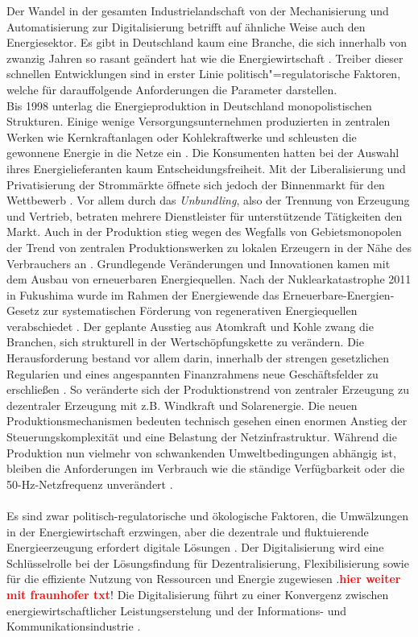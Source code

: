 Der Wandel in der gesamten Industrielandschaft von der Mechanisierung und Automatisierung zur Digitalisierung betrifft auf ähnliche Weise auch den Energiesektor. Es gibt in Deutschland kaum eine Branche, die sich innerhalb von zwanzig Jahren so rasant geändert hat wie die Energiewirtschaft \citep{Doleski2015}. Treiber dieser schnellen Entwicklungen sind in erster Linie politisch"=regulatorische Faktoren, welche für darauffolgende Anforderungen die Parameter darstellen.
\\Bis 1998 unterlag die Energieproduktion in Deutschland monopolistischen Strukturen. Einige wenige Versorgungsunternehmen produzierten in zentralen Werken wie Kernkraftanlagen oder Kohlekraftwerke und schleusten die gewonnene Energie in die Netze ein \citep{Utecht2018}. Die Konsumenten hatten bei der Auswahl ihres Energielieferanten kaum Entscheidungsfreiheit. Mit der Liberalisierung und Privatisierung der Strommärkte öffnete sich jedoch der Binnenmarkt für den Wettbewerb \citep{Doleski2017}. Vor allem durch das \textit{Unbundling}, also der Trennung von Erzeugung und Vertrieb, betraten mehrere Dienstleister für unterstützende Tätigkeiten den Markt. Auch in der Produktion stieg wegen des Wegfalls von Gebietsmonopolen der Trend von zentralen Produktionswerken zu lokalen Erzeugern in der Nähe des Verbrauchers an \citep{Utecht2018}. Grundlegende Veränderungen und Innovationen kamen mit dem Ausbau von erneuerbaren Energiequellen. Nach der Nuklearkatastrophe 2011 in Fukushima wurde im Rahmen der Energiewende das Erneuerbare-Energien-Gesetz zur systematischen Förderung von regenerativen Energiequellen verabschiedet \citep{Doleski2015}. Der geplante Ausstieg aus Atomkraft und Kohle zwang die Branchen, sich strukturell in der Wertschöpfungskette zu verändern. Die Herausforderung bestand vor allem darin, innerhalb der strengen gesetzlichen Regularien und eines angespannten Finanzrahmens neue Geschäftsfelder zu erschließen \citep{Doleski2015}. So veränderte sich der Produktionstrend von zentraler Erzeugung zu dezentraler Erzeugung mit z.B. Windkraft und Solarenergie. Die neuen Produktionsmechanismen bedeuten technisch gesehen einen enormen Anstieg der Steuerungskomplexität und eine Belastung der Netzinfrastruktur. Während die Produktion nun vielmehr von schwankenden Umweltbedingungen abhängig ist, bleiben die Anforderungen im Verbrauch wie die ständige Verfügbarkeit oder die 50-Hz-Netzfrequenz unverändert \citep{Utecht2018}.
\\\\
\noindent Es sind zwar politisch-regulatorische und ökologische Faktoren, die Umwälzungen in der Energiewirtschaft erzwingen, aber die dezentrale und fluktuierende Energieerzeugung erfordert digitale Lösungen \citep{Doleski2017}. Der Digitalisierung wird eine Schlüsselrolle bei der Lösungsfindung für Dezentralisierung, Flexibilisierung sowie für die effiziente Nutzung von Ressourcen und Energie zugewiesen \citep{FraunhoferISE}.\textcolor{red}{\textbf{hier weiter mit fraunhofer txt}}!  Die Digitalisierung führt zu einer Konvergenz zwischen energiewirtschaftlicher Leistungserstelung und der Informations- und Kommunikationsindustrie \citep{Doleski2015}.
